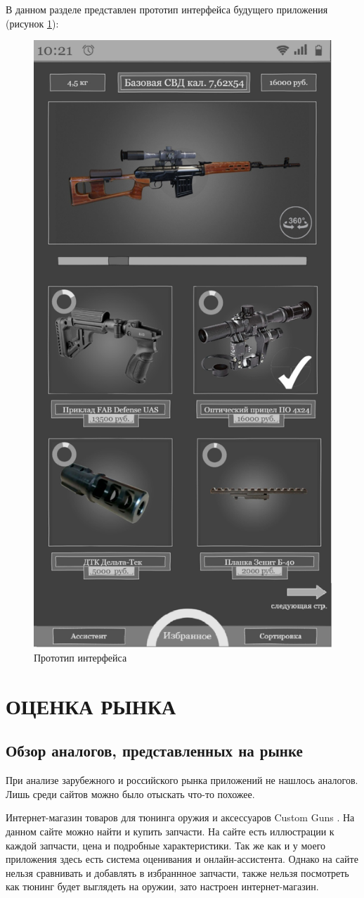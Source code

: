 \documentclass[14pt]{extreport}
\begin{document}
В данном разделе представлен прототип интерфейса будущего приложения (рисунок \ref{fig1}):

\begin{figure}[H]
\centerline{\includegraphics[width=0.55\linewidth]{pic}}
\caption{Прототип интерфейса}
\label{fig1}
\end{figure}


\chapter{ОЦЕНКА РЫНКА\label{chapter2}}
\section{Обзор аналогов, представленных на рынке}

При анализе зарубежного и российского рынка приложений не нашлось аналогов. Лишь среди сайтов можно было отыскать что-то похожее.

Интернет-магазин товаров для тюнинга оружия и аксессуаров Custom Guns \cite{bib1}. На данном сайте можно найти и купить запчасти. На сайте есть иллюстрации к каждой запчасти, цена и подробные характеристики. Так же как и у моего приложения здесь есть система оценивания и онлайн-ассистента. Однако на сайте нельзя сравнивать и добавлять в избраннное запчасти, также нельзя посмотреть как тюнинг будет выглядеть на оружии, зато настроен интернет-магазин.
\end{document}
